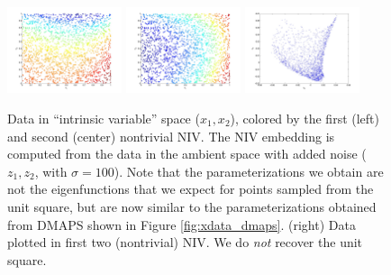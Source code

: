 \documentclass[12pt]{article}
\begin{document}
\begin{figure}[H]
\includegraphics[width=0.3\textwidth]{xdata_noise2_colored_NIV1}
\includegraphics[width=0.3\textwidth]{xdata_noise2_colored_NIV2}
\includegraphics[width=0.3\textwidth]{embedding_noise2}
\caption{Data in ``intrinsic variable'' space ($x_1, x_2$), colored by the first (left) and second (center) nontrivial NIV. The NIV embedding is computed from the data in the ambient space with added noise ($z_1, z_2$, with $\sigma = 100$). Note that the parameterizations we obtain are not the eigenfunctions that we expect for points sampled from the unit square, but are now similar to the parameterizations obtained from DMAPS shown in Figure \ref{fig:xdata_dmaps}. (right) Data plotted in first two (nontrivial) NIV. We do {\em not} recover the unit square.}
\label{fig:xdata_NIV_noise2}
\end{figure}
\end{document}
